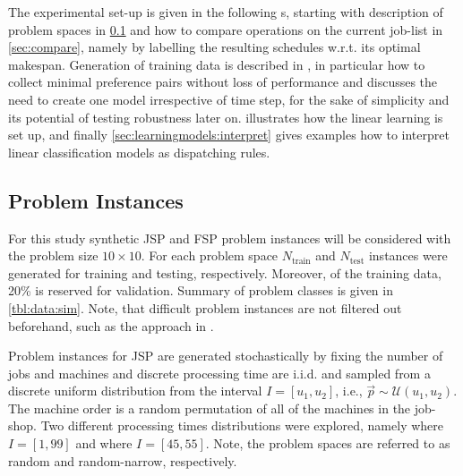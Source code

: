 \documentclass[smallextended]{svjour3}
\begin{document}
The experimental set-up is given in the following 
s, starting with description of problem spaces in 
\cref{sec:data:sim} and how to compare operations on the current job-list in 
\cref{sec:compare}, namely by labelling the resulting schedules w.r.t. its 
optimal makespan. 
Generation of training data is described in , in particular 
how to collect minimal preference pairs without loss of performance 
and discusses the need to create one model irrespective of time step, for the 
sake of simplicity 
and its potential of testing robustness later on.
 illustrates how the linear learning is set up, and 
finally \cref{sec:learningmodels:interpret} gives examples how to interpret 
linear classification models as dispatching rules.

\subsection{Problem Instances}\label{sec:data:sim}

For this study synthetic JSP and FSP problem instances will be considered with 
the problem size $10\times10$. 
For each problem space $N_{\text{train}}$  and $N_{\text{test}}$ instances were 
generated for training and testing, respectively. Moreover, of the training 
data, 20\% is reserved for validation.
Summary of problem classes is given in \cref{tbl:data:sim}.  
Note, that difficult problem instances are not filtered out beforehand, such as 
the approach in \citet{Whitley}. 


Problem instances for JSP are generated stochastically by fixing the number of 
jobs and machines and discrete processing time are i.i.d. and sampled from a 
discrete uniform distribution from the interval $I=[u_1,u_2]$, i.e., 
$\vec{p}\sim \mathcal{U}(u_1,u_2)$. 
The machine order is a random permutation of all of the machines in the 
job-shop.
Two different processing times distributions were explored, namely   
where $I=[1,99]$ and  where $I=[45,55]$. Note, the problem spaces 
are referred to as random and random-narrow, respectively. 
\end{document}
